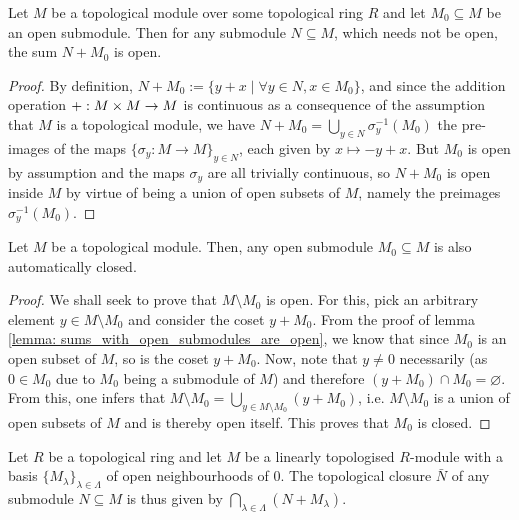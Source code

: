             \begin{lemma} \label{lemma: sums_with_open_submodules_are_open}
                Let $M$ be a topological module over some topological ring $R$ and let $M_0 \subseteq M$ be an open submodule. Then for any submodule $N \subseteq M$, which needs not be open, the sum $N + M_0$ is open. 
            \end{lemma}
                \begin{proof}
                    By definition, $N + M_0 := \{y + x \mid \forall y \in N, x \in M_0\}$, and since the addition operation $+: M \x M \to M$ is continuous as a consequence of the assumption that $M$ is a topological module, we have $N + M_0 = \bigcup_{y \in N} \sigma_y^{-1}(M_0)$ the pre-images of the maps $\{\sigma_y: M \to M\}_{y \in N}$, each given by $x \mapsto -y + x$. But $M_0$ is open by assumption and the maps $\sigma_y$ are all trivially continuous, so $N + M_0$ is open inside $M$ by virtue of being a union of open subsets of $M$, namely the preimages $\sigma_y^{-1}(M_0)$. 
                \end{proof}
            \begin{lemma} \label{lemma: open_submodules_are_closed}
                Let $M$ be a topological module. Then, any open submodule $M_0 \subseteq M$ is also automatically closed.
            \end{lemma}
                \begin{proof}
                    We shall seek to prove that $M \setminus M_0$ is open. For this, pick an arbitrary element $y \in M \setminus M_0$ and consider the coset $y + M_0$. From the proof of lemma \ref{lemma: sums_with_open_submodules_are_open}, we know that since $M_0$ is an open subset of $M$, so is the coset $y + M_0$. Now, note that $y \not = 0$ necessarily (as $0 \in M_0$ due to $M_0$ being a submodule of $M$) and therefore $(y + M_0) \cap M_0 = \varnothing$. From this, one infers that $M \setminus M_0 = \bigcup_{y \in M \setminus M_0} (y + M_0)$, i.e. $M \setminus M_0$ is a union of open subsets of $M$ and is thereby open itself. This proves that $M_0$ is closed. 
                \end{proof}
            \begin{proposition} \label{prop: closure_of_linearly_topologised_submodules}
                Let $R$ be a topological ring and let $M$ be a linearly topologised $R$-module with a basis $\{M_{\lambda}\}_{\lambda \in \Lambda}$ of open neighbourhoods of $0$. The topological closure $\bar{N}$ of any submodule $N \subseteq M$ is thus given by $\bigcap_{\lambda \in \Lambda} (N + M_{\lambda})$.
            \end{proposition}
